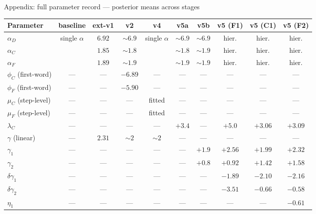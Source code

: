 \documentclass[10pt,aspectratio=169]{beamer}
\newcommand{\main}[1]{\textcolor{CSP-main-dark}{\textbf{#1}}}
\newcommand{\emp}[1]{\textcolor{CSP-emphasis}{\textbf{#1}}}
\newcommand{\muted}[1]{\textcolor{CSP-text-light}{#1}}
\begin{document}
\begin{frame}{Appendix: full parameter record --- posterior means across stages}
\scriptsize
\begin{center}
\renewcommand{\arraystretch}{1.10}
\begin{tabular}{l cc cc ccccc}
\toprule
Parameter & baseline & ext-v1 & \muted{v2} & \muted{v4} & v5a & v5b & v5 (F1) & v5 (C1) & v5 (F2) \\
\midrule
$\alpha_D$           & single $\alpha$ & $6.92$ & $\sim 6.9$ & single $\alpha$ & $\sim 6.9$ & $\sim 6.9$ & hier. & hier. & hier. \\
$\alpha_C$           &                 & $1.85$ & $\sim 1.8$ &                 & $\sim 1.8$ & $\sim 1.9$ & hier. & hier. & hier. \\
$\alpha_F$           &                 & $1.89$ & $\sim 1.9$ &                 & $\sim 1.9$ & $\sim 1.9$ & hier. & hier. & hier. \\
\midrule
$\phi_C$ (first-word) & ---   & ---    & \emp{$-6.89$} & ---    & ---   & ---    & ---    & ---    & ---     \\
$\phi_F$ (first-word) & ---   & ---    & \emp{$-5.90$} & ---    & ---   & ---    & ---    & ---    & ---     \\
$\mu_C$ (step-level)  & ---   & ---    & ---    & fitted & ---   & ---    & ---    & ---    & ---     \\
$\mu_F$ (step-level)  & ---   & ---    & ---    & fitted & ---   & ---    & ---    & ---    & ---     \\
\midrule
$\lambda_C$           & ---   & ---    & ---    & ---    & \main{$+3.4$} & ---    & \main{$+5.0$} & \main{$+3.06$} & \main{$+3.09$} \\
$\gamma$ (linear)     & ---   & $2.31$ & $\sim 2$ & $\sim 2$ & ---   & ---    & ---    & ---    & ---    \\
$\gamma_1$            & ---   & ---    & ---    & ---    & ---   & $+1.9$ & $+2.56$ & $+1.99$ & $+2.32$ \\
$\gamma_2$            & ---   & ---    & ---    & ---    & ---   & $+0.8$ & $+0.92$ & $+1.42$ & $+1.58$ \\
$\delta\gamma_1$      & ---   & ---    & ---    & ---    & ---   & ---    & $-1.89$ & $-2.10$ & $-2.16$ \\
$\delta\gamma_2$      & ---   & ---    & ---    & ---    & ---   & ---    & $-3.51$ & $-0.66$ & $-0.58$ \\
$\eta_1$              & ---   & ---    & ---    & ---    & ---   & ---    & ---    & ---    & $-0.61$ \\

\end{tabular}
\end{center}
\end{frame}
\end{document}
